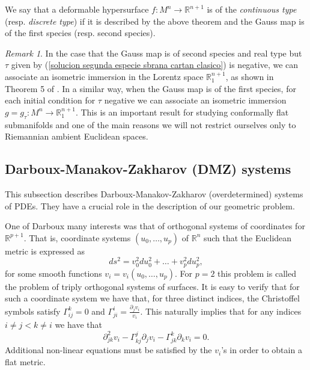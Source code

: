 \documentclass{article}
\theoremstyle{remark}
\newtheorem{remark}[thm]{Remark}
\begin{document}
We say that a deformable hypersurface $f:M^n\rightarrow\mathbb{R}^{n+1}$ is of the {\it continuous type} (resp. {\it discrete type}) if it is described by the above theorem and the Gauss map is of the first species (resp. second species). 

\begin{remark}
    In the case that the Gauss map is of second species and real type but $\tau$ given by (\ref{solucion segunda especie sbrana cartan clasico}) is negative, we can associate an isometric immersion in the Lorentz space $\mathbb{R}^{n+1}_1$, as shown in Theorem 5 of \cite{DF2}. In a similar way, when the Gauss map is of the first species, for each initial condition for $\tau$ negative we can associate an isometric immersion $g=g_\tau:M^n\rightarrow\mathbb{R}_1^{n+1}$. This is an important result for studying conformally flat submanifolds and one of the main reasons we will not restrict ourselves only to Riemannian ambient Euclidean spaces.  
\end{remark}

\subsection{Darboux-Manakov-Zakharov (DMZ) systems}\label{sistemas de Darboux}
This subsection describes Darboux-Manakov-Zakharov (overdetermined) systems of PDEs. They have a crucial role in the description of our geometric problem.

\text{ }

One of Darboux many interests was that of orthogonal systems of coordinates for $\mathbb{R}^{p+1}$. That is, coordinate systems $(u_0,\ldots,u_p)$ of $\mathbb{R}^n$ such that the Euclidean metric is expressed as
\begin{equation*}
    ds^2=v_0^2du_0^2+\ldots+v_p^2du_p^2,
\end{equation*}
for some smooth functions $v_i=v_i(u_0,\ldots,u_p)$. For $p=2$ this problem is called the problem of triply orthogonal systems of surfaces. 
It is easy to verify that for such a coordinate system we have that, for three distinct indices, the Christoffel symbols satisfy $\Gamma_{ij}^k=0$ and $\Gamma_{ji}^i=\frac{\partial_jv_i}{v_i}$.
This naturally implies that for any indices $i\neq j<k\neq i$ we have that
\begin{equation}\label{ecuacion de los vi}
    \partial^2_{jk}v_i-\Gamma_{kj}^j\partial_jv_i-\Gamma_{jk}^k\partial_kv_i=0.
\end{equation}
Additional non-linear equations must be satisfied by the $v_i$'s in order to obtain a flat metric.
\end{document}
